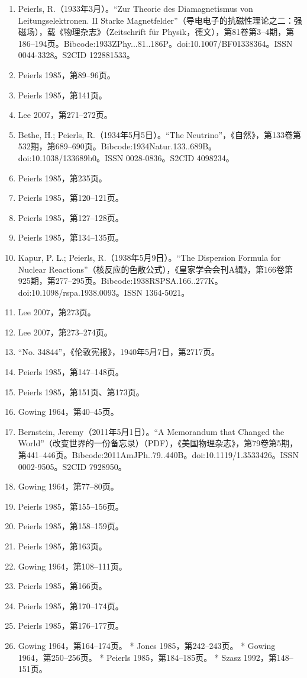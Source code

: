\begin{enumerate}
\item Peierls, R.（1933年3月）。“Zur Theorie des Diamagnetismus von Leitungselektronen. II Starke Magnetfelder”（导电电子的抗磁性理论之二：强磁场），载《物理杂志》（Zeitschrift für Physik，德文），第81卷第3–4期，第186–194页。Bibcode:1933ZPhy...81..186P。doi:10.1007/BF01338364。ISSN 0044-3328。S2CID 122881533。
\item Peierls 1985，第89–96页。
\item Peierls 1985，第141页。
\item Lee 2007，第271–272页。
\item Bethe, H.; Peierls, R.（1934年5月5日）。“The Neutrino”，《自然》，第133卷第532期，第689–690页。Bibcode:1934Natur.133..689B。doi:10.1038/133689b0。ISSN 0028-0836。S2CID 4098234。
\item Peierls 1985，第235页。
\item Peierls 1985，第120–121页。
\item Peierls 1985，第127–128页。
\item Peierls 1985，第134–135页。
\item Kapur, P. L.; Peierls, R.（1938年5月9日）。“The Dispersion Formula for Nuclear Reactions”（核反应的色散公式），《皇家学会会刊A辑》，第166卷第925期，第277–295页。Bibcode:1938RSPSA.166..277K。doi:10.1098/rspa.1938.0093。ISSN 1364-5021。
\item Lee 2007，第273页。
\item Lee 2007，第273–274页。
\item “No. 34844”，《伦敦宪报》，1940年5月7日，第2717页。
\item Peierls 1985，第147–148页。
\item Peierls 1985，第151页、第173页。
\item Gowing 1964，第40–45页。
\item Bernstein, Jeremy（2011年5月1日）。“A Memorandum that Changed the World”（改变世界的一份备忘录）（PDF），《美国物理杂志》，第79卷第5期，第441–446页。Bibcode:2011AmJPh..79..440B。doi:10.1119/1.3533426。ISSN 0002-9505。S2CID 7928950。
\item Gowing 1964，第77–80页。
\item Peierls 1985，第155–156页。
\item Peierls 1985，第158–159页。
\item Peierls 1985，第163页。
\item Gowing 1964，第108–111页。
\item Peierls 1985，第166页。
\item Peierls 1985，第170–174页。
\item Peierls 1985，第176–177页。
\item Gowing 1964，第164–174页。
* Jones 1985，第242–243页。
* Gowing 1964，第250–256页。
* Peierls 1985，第184–185页。
* Szasz 1992，第148–151页。

\end{enumerate}
